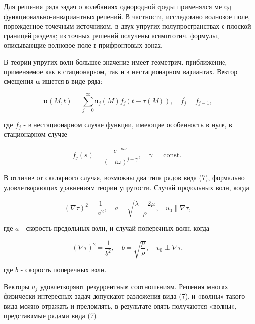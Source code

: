 \documentclass[10pt]{article}
\begin{document}
Для решения ряда задач о колебаниях однородной среды применялся метод функционально-инвариантных репений. В частности, исследовано волновое поле, порожденное точечным источником, в двух упругих полупространствах с плоской границей раздела; из точных решений получены асимптотич. формулы, описывающие волновое поле в прифронтовых зонах.



В теории упругих волн большое значение имеет геометрич. приближение, применяемое как в стационарном, так и в нестационарном вариантах. Вектор смещения $\boldsymbol{u}$ ищется в виде ряда:



\[

\boldsymbol{u}(M, t)=\sum_{j=0}^{\infty} \boldsymbol{u}_{j}(M) f_{j}(t-\tau(M)), \quad f_{j}^{\prime}=f_{j-1},

\]



где $f_{j}$ - в нестационарном случае функции, имеющие особенность в нуле, в стационарном случае



\[

f_{j}(s)=\frac{e^{-i \omega s}}{(-i \omega)^{j+\gamma}}, \quad \gamma=\text { const. }

\]



В отличие от скалярного случая, возможны два типа рядов вида (7), формально удовлетворяющих уравнениям теории упругости. Случай продольных волн, когда



\[

(\nabla \tau)^{2}=\frac{1}{a^{2}}, \quad a=\sqrt{\frac{\lambda+2 \mu}{\rho}}, \quad u_{0} \| \nabla \tau,

\]



где $a$ - скорость продольных волн, и случай поперечных волн, когда



\[

(\nabla \tau)^{2}=\frac{1}{b^{2}}, \quad b=\sqrt{\frac{\mu}{\rho}}, \quad u_{0} \perp \nabla \tau,

\]



где $b$ - скорость поперечных волн.



Векторы $u_{j}$ удовлетворяют рекуррентным соотношениям. Решения многих физически интересных задач допускают разложения вида (7), и «волны» такого вида можно отражать и преломлять, в результате опять получаются «волны», представимые рядами вида (7).
\end{document}
